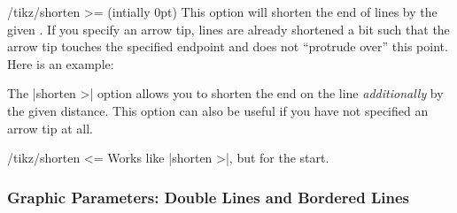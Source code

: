 \begin{key}{/tikz/shorten >= (intially 0pt)}
  This option will shorten the end of lines by the given
  . If you specify an arrow tip, lines are already
  shortened a bit such that the arrow tip touches the specified endpoint
  and does not ``protrude over'' this point. Here is an example:

\begin{codeexample}[]
\end{codeexample}

  The |shorten >| option allows you to shorten the end on the line
  \emph{additionally} by the given distance. This option can also be
  useful if you have not specified an arrow tip at all.

\begin{codeexample}[]
\end{codeexample}
\end{key}


\begin{key}{/tikz/shorten <=}
  Works like |shorten >|, but for the start.
\end{key}



\subsubsection{Graphic Parameters: Double Lines and Bordered Lines}

